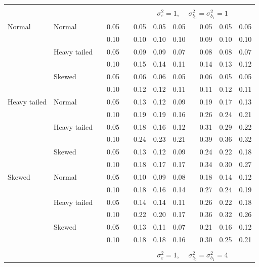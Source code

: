 \documentclass[12pt]{article} %
\begin{document}
\begin{table}[ht]
\begin{scriptsize}
\begin{center}
\begin{tabular}{ll p{.1cm} c p{.1cm} rrr p{.1cm} rrr}
&&&&&&&&&&&\\
& && && \multicolumn{7}{c}{$\sigma_{\varepsilon}^2 = 1$, \ \ $\sigma_{b_0}^2 = \sigma_{b_1}^2 = 1$} \\ \cline{6-12}
Normal       & Normal       && 0.05 &&  0.05 & 0.05 & 0.05 && 0.05 & 0.05 & 0.05 \\ 
             &              && 0.10 &&  0.10 & 0.10 & 0.10 && 0.09 & 0.10 & 0.10 \\ 
             & Heavy tailed && 0.05 &&  0.09 & 0.09 & 0.07 && 0.08 & 0.08 & 0.07 \\ 
             &              && 0.10 &&  0.15 & 0.14 & 0.11 && 0.14 & 0.13 & 0.12 \\ 
             & Skewed       && 0.05 &&  0.06 & 0.06 & 0.05 && 0.06 & 0.05 & 0.05 \\ 
             &              && 0.10 &&  0.12 & 0.12 & 0.11 && 0.11 & 0.12 & 0.11 \\ 
Heavy tailed & Normal       && 0.05 &&  0.13 & 0.12 & 0.09 && 0.19 & 0.17 & 0.13 \\ 
             &              && 0.10 &&  0.19 & 0.19 & 0.16 && 0.26 & 0.24 & 0.21 \\ 
             & Heavy tailed && 0.05 &&  0.18 & 0.16 & 0.12 && 0.31 & 0.29 & 0.22 \\ 
             &              && 0.10 &&  0.24 & 0.23 & 0.21 && 0.39 & 0.36 & 0.32 \\ 
             & Skewed       && 0.05 &&  0.13 & 0.12 & 0.09 && 0.24 & 0.22 & 0.18 \\ 
             &              && 0.10 &&  0.18 & 0.17 & 0.17 && 0.34 & 0.30 & 0.27 \\ 
Skewed       & Normal       && 0.05 &&  0.10 & 0.09 & 0.08 && 0.18 & 0.14 & 0.12 \\ 
             &              && 0.10 &&  0.18 & 0.16 & 0.14 && 0.27 & 0.24 & 0.19 \\ 
             & Heavy tailed && 0.05 &&  0.14 & 0.14 & 0.11 && 0.26 & 0.22 & 0.18 \\ 
             &              && 0.10 &&  0.22 & 0.20 & 0.17 && 0.36 & 0.32 & 0.26 \\ 
             & Skewed       && 0.05 &&  0.13 & 0.11 & 0.07 && 0.21 & 0.16 & 0.12 \\ 
             &              && 0.10 &&  0.18 & 0.18 & 0.16 && 0.30 & 0.25 & 0.21 \\ 


&&&&&&&&&&&\\
& && && \multicolumn{7}{c}{$\sigma_{\varepsilon}^2 = 1$, \ \ $\sigma_{b_0}^2 = \sigma_{b_1}^2 = 4$} \\ \cline{6-12}


\hline
\end{tabular}
\end{center}
\end{scriptsize}
\end{table}
\end{document}
